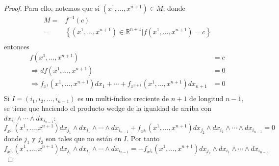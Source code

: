 \documentclass[12pt]{report}
\theoremstyle{largebreak}
\begin{document}
\begin{proof}
        Para ello, notemos que si $(x^1,\dots,x^{n+1})\in M$, donde
        \begin{equation*}
            \begin{split}
                M=&f^{-1}(c)\\
                =&\left\{(x^1,\dots,x^{n+1})\in \mathbb{R}^{n+1}|f(x^1,\dots,x^{n+1})=c\right\} \\
            \end{split}
        \end{equation*}
        entonces
        \begin{equation*}
            \begin{split}
                f(x^1,\dots,x^{n+1})&=c\\
                \Rightarrow df(x^1,\dots,x^{n+1})&=0\\
                \Rightarrow f_{x^1}(x^1,\dots,x^{n+1})dx_1+\cdots+f_{x^{n+1}}(x^1,\dots,x^{n+1})dx_{n+1}&=0\\
            \end{split}
        \end{equation*}
        Si $I=(i_1,i_2,\dots,i_{n-1})$ es un multi-índice creciente de $n+1$ de longitud $n-1$, se tiene que haciendo el producto wedge de la igualdad de arriba con $dx_{i_1}\wedge\cdots\wedge dx_{i_{n-1}}$:
        \begin{equation*}
            f_{x^{j_1}}(x^1,\dots,x^{n+1})dx_{j_1}\wedge dx_{i_1}\wedge\cdots\wedge dx_{i_{n-1}}+f_{x^{j_2}}(x^1,\dots,x^{n+1})dx_{j_2}\wedge dx_{i_1}\wedge\cdots\wedge dx_{i_{n-1}}=0
        \end{equation*}
        donde $j_1$ y $j_2$ son tales que no están en $I$. Por tanto
        \begin{equation}
            f_{x^{j_1}}(x^1,\dots,x^{n+1})dx_{j_1}\wedge dx_{i_1}\wedge\cdots\wedge dx_{i_{n-1}}=-f_{x^{j_2}}(x^1,\dots,x^{n+1})dx_{j_2}\wedge dx_{i_1}\wedge\cdots\wedge dx_{i_{n-1}}
        \end{equation}


\end{proof}
\end{document}
